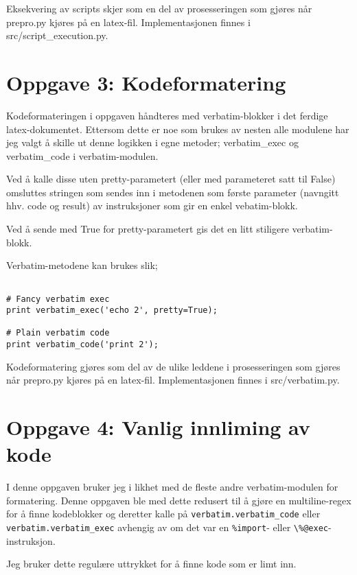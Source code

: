\documentclass{article}
\renewenvironment{shadedwbar}{
\def\FrameCommand{\color[rgb]{0.7,     0.95686, 1}\vrule width 1mm\normalcolor\colorbox{shadecolor}}\FrameRule0.6pt
\MakeFramed {\advance\hsize-2mm\FrameRestore}\vskip3mm}{\vskip0mm\endMakeFramed}
\renewenvironment{shadedquoteBlueBar}[1][]{
\bgroup\rmfamily
\fboxsep=0mm\relax
\begin{shadedwbar}
\list{}{\parsep=-2mm\parskip=0mm\topsep=0pt\leftmargin=2mm
\rightmargin=2\leftmargin\leftmargin=4pt\relax}
\item\relax}
{\endlist\end{shadedwbar}\egroup}
\begin{document}
Eksekvering av scripts skjer som en del av prosesseringen som gjøres når prepro.py kjøres på en latex-fil. Implementasjonen finnes i src/script\_execution.py.

\section*{Oppgave 3: Kodeformatering}

Kodeformateringen i oppgaven håndteres med verbatim-blokker i det ferdige latex-dokumentet. Ettersom dette er noe som brukes av nesten alle modulene har jeg valgt å skille ut denne logikken i egne metoder; verbatim\_exec og verbatim\_code i verbatim-modulen.

Ved å kalle disse uten pretty-parametert (eller med parameteret satt til False) omsluttes stringen som sendes inn i metodenen som første parameter (navngitt hhv. code og result) av instruksjoner som gir en enkel vebatim-blokk.

Ved å sende med True for pretty-parametert gis det en litt stiligere verbatim-blokk.

Verbatim-metodene kan brukes slik;

\begin{shadedquoteBlueBar}
\fontsize{9pt}{9pt}
\begin{Verbatim}

# Fancy verbatim exec
print verbatim_exec('echo 2', pretty=True);

# Plain verbatim code
print verbatim_code('print 2');
\end{Verbatim}
\end{shadedquoteBlueBar}
\noindent


Kodeformatering gjøres som del av de ulike leddene i prosesseringen som gjøres når prepro.py kjøres på en latex-fil. Implementasjonen finnes i src/verbatim.py.

\section*{Oppgave 4: Vanlig innliming av kode}

I denne oppgaven bruker jeg i likhet med de fleste andre verbatim-modulen for formatering. Denne oppgaven ble med dette redusert til å gjøre en multiline-regex for å finne kodeblokker og deretter kalle på \verb;verbatim.verbatim_code; eller \verb;verbatim.verbatim_exec; avhengig av om det var en \verb;%import;- eller \verb;\%@exec;-instruksjon.

Jeg bruker dette regulære uttrykket for å finne kode som er limt inn.
\end{document}
